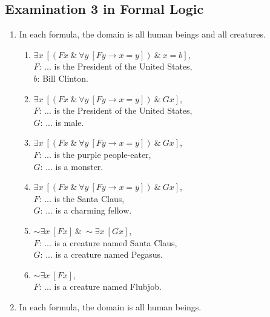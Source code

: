 \documentclass[a4paper,12pt]{article}
\newcommand{\ra}{\rightarrow}
\newcommand{\s}{\sim}
\newcommand{\ta}{ \ \& \ }
\newcommand{\all}{\forall}
\newcommand{\ex}{\exists}
\begin{document}
    \subsection*{Examination 3 in Formal Logic}

    \begin{enumerate}[label=\arabic*,leftmargin=*]
        \item In each formula, the domain is all human beings and all creatures.
            \begin{enumerate}[label=(\roman*)]
                \item $\ex x \ [(Fx \ta \all y \ [Fy \ra x=y]) \ta x=b]$,\\
                    $F$: ... is the President of the United States,\\
                    $b$: Bill Clinton.
                \item $\ex x \ [(Fx \ta \all y \ [Fy \ra x=y]) \ta Gx]$,\\
                    $F$: ... is the President of the United States,\\
                    $G$: ... is male.
                \item $\ex x \ [(Fx \ta \all y \ [Fy \ra x=y]) \ta Gx]$,\\
                    $F$: ... is the purple people-eater,\\
                    $G$: ... is a monster.
                \item $\ex x \ [(Fx \ta \all y \ [Fy \ra x=y]) \ta Gx]$,\\
                    $F$: ... is the Santa Claus,\\
                    $G$: ... is a charming fellow.
                \item $\s \ex x \ [Fx] \ta \s \ex x \ [Gx]$,\\
                    $F$: ... is a creature named Santa Claus,\\
                    $G$: ... is a creature named Pegasus.
                \item $\s \ex x \ [Fx]$,\\
                    $F$: ... is a creature named Flubjob.
            \end{enumerate}
        \item In each formula, the domain is all human beings.
\end{enumerate}
\end{document}
